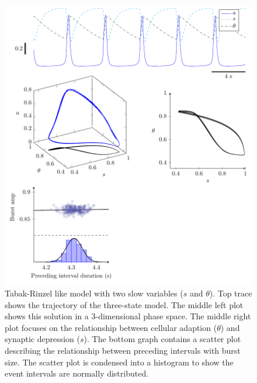 \documentclass[12pt]{article}
\begin{document}
\begin{figure}
\centering 
\includegraphics[width=\textwidth]{Fig02TabakRinzelTwoVarRepresentative_v2.pdf}
\caption{Tabak-Rinzel like model with two slow variables ($s$ and $\theta$). Top trace shows the trajectory of the three-state model. The middle left plot shows this solution in a 3-dimensional phase space. The middle right plot focuses on the relationship between cellular adaption ($\theta$) and synaptic depression ($s$). The bottom graph contains a scatter plot describing the relationship between preceding intervals with burst size. The scatter plot is condensed into a histogram to show the event intervals are normally distributed.}
\label{TabakRinzelTwoVarRepresentative}
\end{figure}
\end{document}
